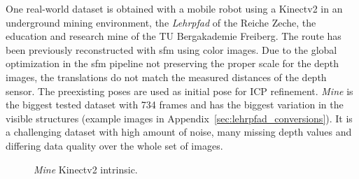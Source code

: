 One real-world dataset is obtained with a mobile robot using a Kinectv2 in an underground mining environment, the \emph{Lehrpfad} of the Reiche Zeche, the education and research mine of the TU Bergakademie Freiberg.
The route has been previously reconstructed with \gls{sfm} using color images.
Due to the global optimization in the \gls{sfm} pipeline not preserving the proper scale for the depth images, the translations do not match the measured distances of the depth sensor.
The preexisting poses are used as initial pose for ICP refinement.
\emph{Mine} is the biggest tested dataset with 734 frames and has the biggest variation in the visible structures (example images in Appendix~\ref{sec:lehrpfad_conversions}).
It is a challenging dataset with high amount of noise, many missing depth values and differing data quality over the whole set of images.
\begin{figure}[H]
\CenterFloatBoxes%
\begin{floatrow}
    {\caption{\emph{Mine} Kinectv2 intrinsic.}\label{tab:lehrpfad_intrinsic}}%
\end{floatrow}
\end{figure}
